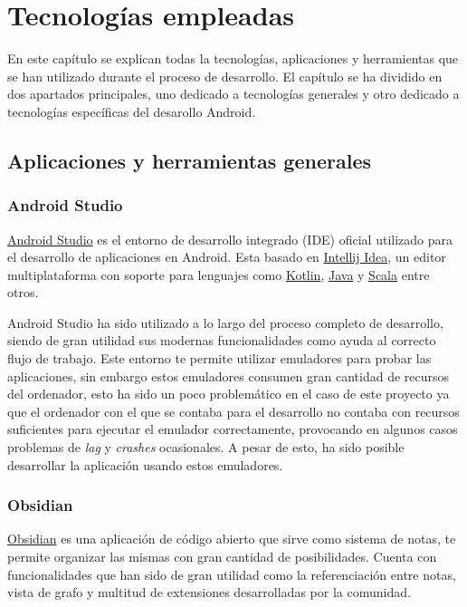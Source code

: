 \chapter{Tecnologías empleadas}
\label{cap:tecnologiasEmpleadas}
En este capítulo se explican todas la tecnologías, aplicaciones y herramientas que se han utilizado durante el proceso de desarrollo. El capítulo se ha dividido en dos apartados principales, uno dedicado a tecnologías generales y otro dedicado a tecnologías específicas del desarollo Android.

\section{Aplicaciones y herramientas generales}
\hypertarget{subsec:android_studio}{}
\subsection{Android Studio}
\href{https://developer.android.com/studio/intro}{Android Studio} es el entorno de desarrollo integrado (IDE) oficial utilizado para el desarrollo de aplicaciones en Android. Esta basado en \href{https://www.jetbrains.com/idea}{Intellij Idea}, un editor multiplataforma con soporte para lenguajes como \hyperlink{subsec:kotlin}{Kotlin}, \href{https://www.java.com}{Java} y \href{https://www.scala-lang.org}{Scala} entre otros. 

Android Studio ha sido utilizado a lo largo del proceso completo de desarrollo, siendo de gran utilidad sus modernas funcionalidades como ayuda al correcto flujo de trabajo. Este entorno te permite utilizar emuladores para probar las aplicaciones, sin embargo estos emuladores consumen gran cantidad de recursos del ordenador, esto ha sido un poco problemático en el caso de este proyecto ya que el ordenador con el que se contaba para el desarrollo no contaba con recursos suficientes para ejecutar el emulador correctamente, provocando en algunos casos problemas de \textit{lag} y \textit{crashes} ocasionales. A pesar de esto, ha sido posible desarrollar la aplicación usando estos emuladores.

\subsection{Obsidian}
\href{https://obsidian.md/}{Obsidian} es una aplicación de código abierto que sirve como sistema de notas, te permite organizar las mismas con gran cantidad de posibilidades. Cuenta con funcionalidades que han sido de gran utilidad como la referenciación entre notas, vista de grafo y multitud de extensiones desarrolladas por la comunidad.

